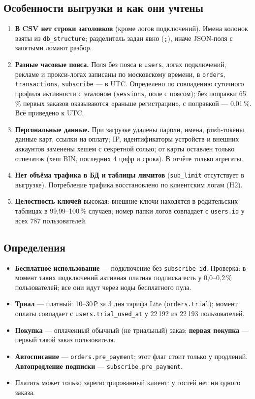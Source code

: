\documentclass[11pt,a4paper]{article}
\begin{document}
\subsection{Особенности выгрузки и как они учтены}
\begin{enumerate}
  \item \textbf{В CSV нет строки заголовков} (кроме логов подключений). Имена колонок взяты из \texttt{db\_structure}; разделитель задан явно (\texttt{;}), иначе JSON-поля с запятыми ломают разбор.
  \item \textbf{Разные часовые пояса.} Поля без пояса в \texttt{users}, логах подключений, рекламе и прокси-логах записаны по московскому времени, в \texttt{orders}, \texttt{transactions}, \texttt{subscribe} --- в UTC. Определено по совпадению суточного профиля активности с эталоном (\texttt{sessions}, поле с поясом); без поправки 65\,\% первых заказов оказываются «раньше регистрации», с поправкой --- 0,01\,\%. Всё приведено к UTC.
  \item \textbf{Персональные данные.} При загрузке удалены пароли, имена, push-токены, данные карт, ссылки на оплату; IP, идентификаторы устройств и внешних аккаунтов заменены хешем с секретной солью; от карты оставлен только отпечаток (хеш BIN, последних 4 цифр и срока). В отчёте только агрегаты.
  \item \textbf{Нет объёма трафика в БД и таблицы лимитов} (\texttt{sub\_limit} отсутствует в выгрузке). Потребление трафика восстановлено по клиентским логам (H2).
  \item \textbf{Целостность ключей} высокая: внешние ключи находятся в родительских таблицах в 99,99--100\,\% случаев; номер папки логов совпадает с \texttt{users.id} у всех 787 пользователей.
\end{enumerate}

\subsection{Определения}
\begin{itemize}
  \item \textbf{Бесплатное использование} --- подключение без \texttt{subscribe\_id}. Проверка: в момент таких подключений активная платная подписка есть у 0,0--0,2\,\% пользователей; все они идут через ноды бесплатного пула.
  \item \textbf{Триал} --- платный: 10--30\,₽ за 3 дня тарифа Lite (\texttt{orders.trial}); момент оплаты совпадает с \texttt{users.trial\_used\_at} у 22\,192 из 22\,193 пользователей.
  \item \textbf{Покупка} --- оплаченный обычный (не триальный) заказ; \textbf{первая покупка} --- первый такой заказ пользователя.
  \item \textbf{Автосписание} --- \texttt{orders.pre\_payment}; этот флаг стоит только у продлений. \textbf{Автопродление подписки} --- \texttt{subscribe.pre\_payment}.
  \item Платить может только зарегистрированный клиент: у гостей нет ни одного заказа.
\end{itemize}
\end{document}
